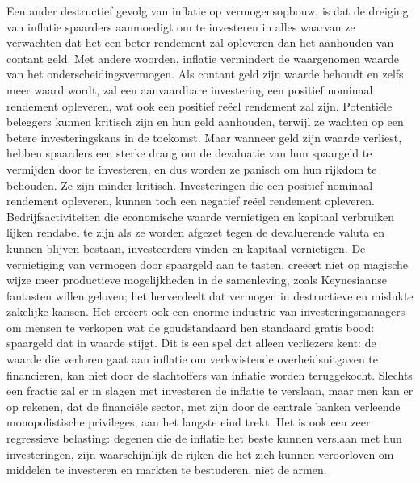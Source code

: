 \documentclass[
  a5paper,
  smalldemyvopaper,11pt,twoside,onecolumn,openright,extrafontsizes,
hidelinks]{memoir}
\begin{document}
Een ander destructief gevolg van inflatie op vermogensopbouw, is dat de
dreiging van inflatie spaarders aanmoedigt om te investeren in alles
waarvan ze verwachten dat het een beter rendement zal opleveren dan het
aanhouden van contant geld. Met andere woorden, inflatie vermindert de
waargenomen waarde van het onderscheidingsvermogen. Als contant geld
zijn waarde behoudt en zelfs meer waard wordt, zal een aanvaardbare
investering een positief nominaal rendement opleveren, wat ook een
positief reëel rendement zal zijn. Potentiële beleggers kunnen kritisch
zijn en hun geld aanhouden, terwijl ze wachten op een betere
investeringskans in de toekomst. Maar wanneer geld zijn waarde verliest,
hebben spaarders een sterke drang om de devaluatie van hun spaargeld te
vermijden door te investeren, en dus worden ze panisch om hun rijkdom te
behouden. Ze zijn minder kritisch. Investeringen die een positief
nominaal rendement opleveren, kunnen toch een negatief reëel rendement
opleveren. Bedrijfsactiviteiten die economische waarde vernietigen en
kapitaal verbruiken lijken rendabel te zijn als ze worden afgezet tegen
de devaluerende valuta en kunnen blijven bestaan, investeerders vinden
en kapitaal vernietigen. De vernietiging van vermogen door spaargeld aan
te tasten, creëert niet op magische wijze meer productieve mogelijkheden
in de samenleving, zoals Keynesiaanse fantasten willen geloven; het
herverdeelt dat vermogen in destructieve en mislukte zakelijke kansen.
Het creëert ook een enorme industrie van investeringsmanagers om mensen
te verkopen wat de goudstandaard hen standaard gratis bood: spaargeld
dat in waarde stijgt. Dit is een spel dat alleen verliezers kent: de
waarde die verloren gaat aan inflatie om verkwistende overheidsuitgaven
te financieren, kan niet door de slachtoffers van inflatie worden
teruggekocht. Slechts een fractie zal er in slagen met investeren de
inflatie te verslaan, maar men kan er op rekenen, dat de financiële
sector, met zijn door de centrale banken verleende monopolistische
privileges, aan het langste eind trekt. Het is ook een zeer regressieve
belasting: degenen die de inflatie het beste kunnen verslaan met hun
investeringen, zijn waarschijnlijk de rijken die het zich kunnen
veroorloven om middelen te investeren en markten te bestuderen, niet de
armen.
\end{document}
